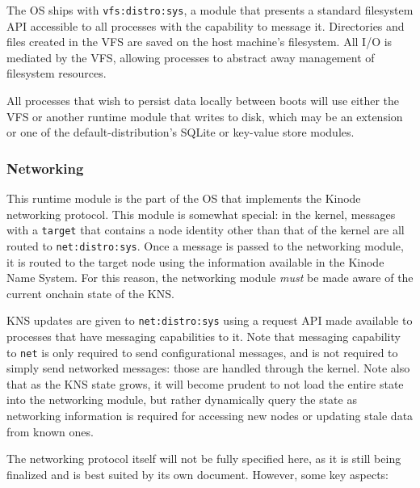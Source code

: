 \documentclass[runningheads]{llncs}
\begin{document}
The OS ships with \verb|vfs:distro:sys|, a module that presents a standard filesystem API accessible to all processes with the capability to message it.
Directories and files created in the VFS are saved on the host machine's filesystem.
All I/O is mediated by the VFS, allowing processes to abstract away management of filesystem resources.

All processes that wish to persist data locally between boots will use either the VFS or another runtime module that writes to disk, which may be an extension or one of the default-distribution's SQLite or key-value store modules.

\subsubsection{Networking}
\label{sec:osnetworking}

This runtime module is the part of the OS that implements the Kinode networking protocol.
This module is somewhat special: in the kernel, messages with a \verb|target| that contains a node identity other than that of the kernel are all routed to \verb|net:distro:sys|.
Once a message is passed to the networking module, it is routed to the target node using the information available in the Kinode Name System.
For this reason, the networking module \textit{must} be made aware of the current onchain state of the KNS.

KNS updates are given to \verb|net:distro:sys| using a request API made available to processes that have messaging capabilities to it.
Note that messaging capability to \verb|net| is only required to send configurational messages, and is not required to simply send networked messages: those are handled through the kernel.
Note also that as the KNS state grows, it will become prudent to not load the entire state into the networking module, but rather dynamically query the state as networking information is required for accessing new nodes or updating stale data from known ones.

The networking protocol itself will not be fully specified here, as it is still being finalized and is best suited by its own document. However, some key aspects:
\end{document}
